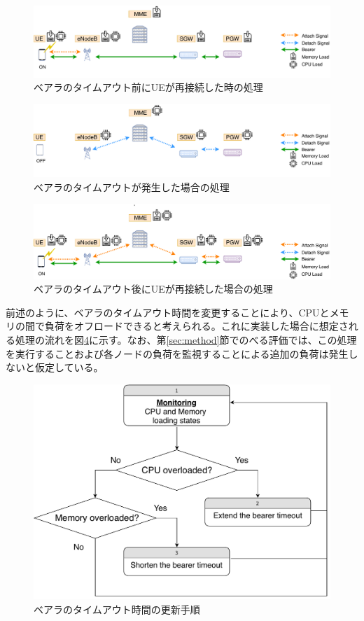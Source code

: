 \documentclass[a4j]{ujarticle}
\begin{document}
\begin{figure}[htbp]
	\centering
	\includegraphics[width=0.7\hsize]{detach-reON.pdf}
  \caption{ベアラのタイムアウト前にUEが再接続した時の処理}
	\label{detach-reON}
\end{figure}

\begin{figure}[htbp]
	\centering
	\includegraphics[width=0.7\hsize]{detach-timeout.pdf}
  \caption{ベアラのタイムアウトが発生した場合の処理}
	\label{detach-timeout}
\end{figure}

\begin{figure}[htbp]
	\centering
	\includegraphics[width=0.7\hsize]{detach-timeout-ON.pdf}
  \caption{ベアラのタイムアウト後にUEが再接続した場合の処理}
	\label{detach-timeout-ON}
\end{figure}

前述のように、ベアラのタイムアウト時間を変更することにより、CPUとメモリの間で負荷をオフロードできると考えられる。これに実装した場合に想定される処理の流れを図\ref{chart}に示す。なお、第\ref{sec:method}節でのべる評価では、この処理を実行することおよび各ノードの負荷を監視することによる追加の負荷は発生しないと仮定している。
\begin{figure}[htbp]
	\centering
	\includegraphics[width=0.7\hsize]{chart.pdf}
  \caption{ベアラのタイムアウト時間の更新手順}
	\label{chart}
\end{figure}
\end{document}
